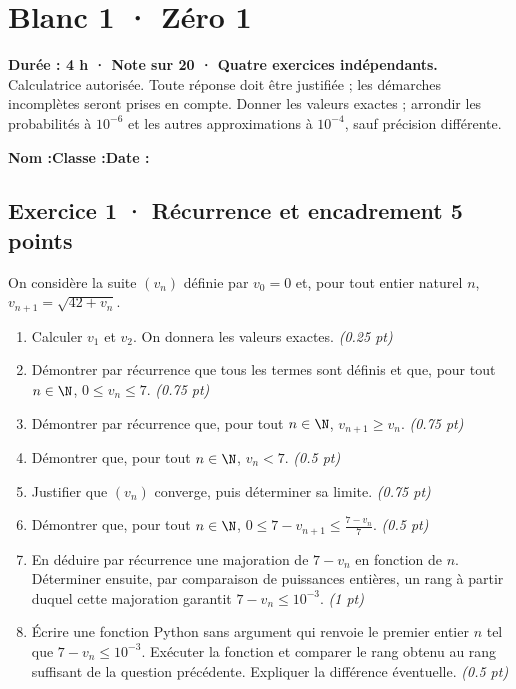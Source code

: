 \mxnewpage{}\label{sujet:5-1}

\section*{Blanc 1 · Zéro 1}


\textbf{Durée : 4 h · Note sur 20 · Quatre exercices indépendants.}\\Calculatrice autorisée. Toute réponse doit être justifiée ; les démarches incomplètes seront prises en compte. Donner les valeurs exactes ; arrondir les probabilités à $10^{-6}$ et les autres approximations à $10^{-4}$, sauf précision différente.

\smallskip\textbf{Nom :}\enspace\dotfill\quad\textbf{Classe :}\enspace\dotfill\quad\textbf{Date :}\enspace\dotfill

\subsection*{Exercice 1 · Récurrence et encadrement \hfill 5 points}On considère la suite $(v_n)$ définie par $v_0=0$ et, pour tout entier naturel $n$, $v_{n+1}=\sqrt{42+v_n}$.

\begin{enumerate}

\item Calculer $v_1$ et $v_2$. On donnera les valeurs exactes. \hfill\textit{(\num{0,25} pt)}

\item Démontrer par récurrence que tous les termes sont définis et que, pour tout $n\in\N$, $0\le v_n\le7$. \hfill\textit{(\num{0,75} pt)}

\item Démontrer par récurrence que, pour tout $n\in\N$, $v_{n+1}\ge v_n$. \hfill\textit{(\num{0,75} pt)}

\item Démontrer que, pour tout $n\in\N$, $v_n<7$. \hfill\textit{(\num{0,5} pt)}

\item Justifier que $(v_n)$ converge, puis déterminer sa limite. \hfill\textit{(\num{0,75} pt)}

\item Démontrer que, pour tout $n\in\N$, $0\le 7-v_{n+1}\le\frac{7-v_n}{7}$. \hfill\textit{(\num{0,5} pt)}

\item En déduire par récurrence une majoration de $7-v_n$ en fonction de $n$. Déterminer ensuite, par comparaison de puissances entières, un rang à partir duquel cette majoration garantit $7-v_n\le10^{-3}$. \hfill\textit{(1 pt)}

\item Écrire une fonction Python sans argument qui renvoie le premier entier $n$ tel que $7-v_n\le10^{-3}$. Exécuter la fonction et comparer le rang obtenu au rang suffisant de la question précédente. Expliquer la différence éventuelle. \hfill\textit{(\num{0,5} pt)}

\end{enumerate}

